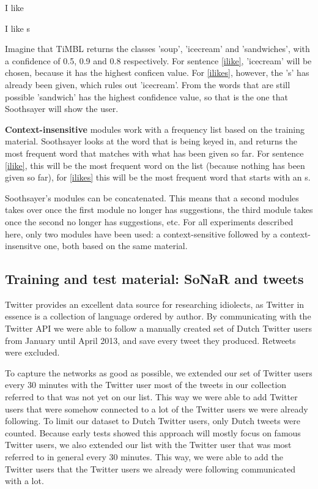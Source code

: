 \documentclass[12pt]{article}
\begin{document}
\begin{examples}
\item I like \label{ilike}
\item I like s \label{ilikes}
\end{examples}

Imagine that TiMBL returns the classes 'soup', 'icecream' and 'sandwiches', with a confidence of 0.5, 0.9 and 0.8 respectively. For sentence \ref{ilike}, 'icecream' will be chosen, because it has the highest conficen value. For \ref{ilikes}, however, the 's' has already been given, which rules out 'icecream'. From the words that are still possible 'sandwich' has the highest confidence value, so that is the one that Soothsayer will show the user.

\textbf{Context-insensitive} modules work with a frequency list based on the training material. Soothsayer looks at the word that is being keyed in, and returns the most frequent word that matches with what has been given so far. For sentence \ref{ilike}, this will be the most frequent word on the list (because nothing has been given so far), for \ref{ilikes} this will be the most frequent word that starts with an s.

Soothsayer's modules can be concatenated. This means that a second modules takes over once the first module no longer has suggestions, the third module takes once the second no longer has suggestions, etc. For all experiments described here, only two modules have been used: a context-sensitive followed by a context-insensitve one, both based on the same material.


\subsection{Training and test material: SoNaR and tweets}



Twitter provides an excellent data source for researching idiolects, as Twitter in essence is a collection of language ordered by author. By communicating with the Twitter API we were able to follow a manually created set of Dutch Twitter users from January until April 2013, and save every tweet they produced. Retweets were excluded.

To capture the networks as good as possible, we extended our set of Twitter users every 30 minutes with the Twitter user most of the tweets in our collection referred to that was not yet on our list. This way we were able to add Twitter users that were somehow connected to a lot of the Twitter users we were already following. To limit our dataset to Dutch Twitter users, only Dutch tweets were counted. Because early tests showed this approach will mostly focus on famous Twitter users, we also extended our list with the Twitter user that was most referred to in general every 30 minutes. This way, we were able to add the Twitter users that the Twitter users we already were following communicated with a lot.
\end{document}
